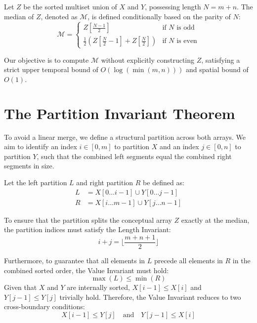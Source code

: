 \documentclass[10pt,journal,compsoc]{IEEEtran}
\begin{document}
Let $Z$ be the sorted multiset union of $X$ and $Y$, possessing length $N = m + n$.
The median of $Z$, denoted as $\mathcal{M}$, is defined conditionally based on the parity of $N$:
\begin{equation}
\mathcal{M} = 
\begin{cases} 
Z\left[\frac{N-1}{2}\right] & \text{if } N \text{ is odd} \\
\frac{1}{2}\left(Z\left[\frac{N}{2} - 1\right] + Z\left[\frac{N}{2}\right]\right) & \text{if } N \text{ is even} 
\end{cases}
\end{equation}

Our objective is to compute $\mathcal{M}$ without explicitly constructing $Z$, satisfying a strict upper temporal bound of $O(\log(\min(m, n)))$ and spatial bound of $O(1)$.

\section{The Partition Invariant Theorem}
To avoid a linear merge, we define a structural partition across both arrays. We aim to identify an index $i \in [0, m]$ to partition $X$ and an index $j \in [0, n]$ to partition $Y$, such that the combined left segments equal the combined right segments in size.

Let the left partition $L$ and right partition $R$ be defined as:
\begin{align}
L &= X[0 \dots i-1] \cup Y[0 \dots j-1] \\
R &= X[i \dots m-1] \cup Y[j \dots n-1]
\end{align}

To ensure that the partition splits the conceptual array $Z$ exactly at the median, the partition indices must satisfy the Length Invariant:
\begin{equation}
i + j = \lfloor \frac{m + n + 1}{2} \rfloor
\end{equation}

Furthermore, to guarantee that all elements in $L$ precede all elements in $R$ in the combined sorted order, the Value Invariant must hold:
\begin{equation}
\max(L) \le \min(R)
\end{equation}
Given that $X$ and $Y$ are internally sorted, $X[i-1] \le X[i]$ and $Y[j-1] \le Y[j]$ trivially hold. Therefore, the Value Invariant reduces to two cross-boundary conditions:
\begin{equation}
X[i-1] \le Y[j] \quad \text{and} \quad Y[j-1] \le X[i]
\end{equation}
\end{document}
